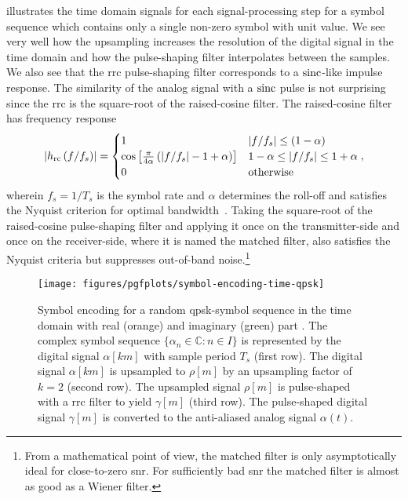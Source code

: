 illustrates the time domain signals for each signal-processing step for a symbol sequence which contains only a single non-zero symbol with unit value.
We see very well how the upsampling increases the resolution of the digital signal in the time domain and how the pulse-shaping filter interpolates between the samples.
We also see that the \gls{rrc} pulse-shaping filter corresponds to a $\sinc$-like impulse response.
The similarity of the analog signal with a $\sinc$ pulse is not surprising since the \gls{rrc} is the square-root of the raised-cosine filter.
The raised-cosine filter has frequency response
\begin{equation}
	\abs{h_\text{rc}\left(f/f_s\right)}
	=
	\begin{cases}
		1 & \abs*{f/f_s}\leq(1-\alpha) \\
		\cos\left[\frac{\pi}{4\alpha}\left(\abs*{f/f_s}-1+\alpha\right)\right] & 1-\alpha\leq\abs*{f/f_s}\leq1+\alpha \\
		0 & \text{otherwise}
	\end{cases}
	,
\end{equation}
wherein $f_s=1/T_s$ is the symbol rate and $\alpha$ determines the roll-off and satisfies the Nyquist criterion for optimal bandwidth~\cite[p.~51]{Madhow2008}.
Taking the square-root of the raised-cosine pulse-shaping filter and applying it once on the transmitter-side and once on the receiver-side, where it is named the matched filter, also satisfies the Nyquist criteria but suppresses out-of-band noise.\footnote{From a mathematical point of view, the matched filter is only asymptotically ideal for close-to-zero \gls{snr}. For sufficiently bad \gls{snr} the matched filter is almost as good as a Wiener filter.}
\begin{figure}[htb]
	\centering
	\texttt{[image: figures/pgfplots/symbol-encoding-time-qpsk]}
	\caption{Symbol encoding for a random \gls{qpsk}-symbol sequence in the time domain with real (orange) and imaginary (green) part . The complex symbol sequence $\{\alpha_n\in\mathbb{C}\colon n\in I\}$ is represented by the digital signal $\alpha[km]$ with sample period $T_s$ (first row). The digital signal $\alpha[km]$ is upsampled to $\rho[m]$ by an upsampling factor of $k=2$ (second row). The upsampled signal $\rho[m]$ is pulse-shaped with a \gls{rrc} filter to yield $\gamma[m]$ (third row). The pulse-shaped digital signal $\gamma[m]$ is converted to the anti-aliased analog signal $\alpha(t)$.}\label{fig:baseband_construction_rand_time}
\end{figure}
